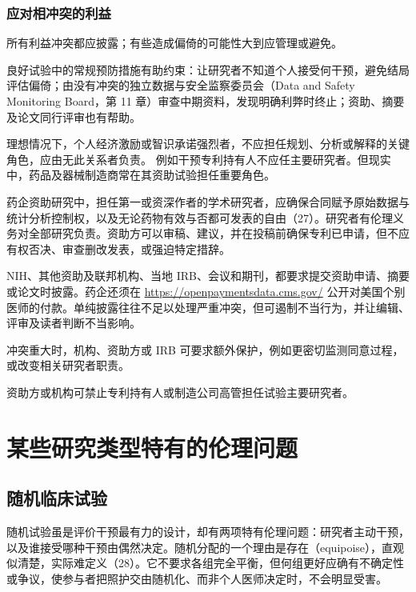 \subsubsection{应对相冲突的利益}
所有利益冲突都应披露；有些造成偏倚的可能性大到应管理或避免。
\begin{description}[leftmargin=2em,labelindent=0pt,style=nextline]
\item[减少偏倚。]良好试验中的常规预防措施有助约束：让研究者不知道个人接受何干预，避免结局评估偏倚；由没有冲突的独立数据与安全监察委员会（Data and Safety Monitoring Board，第 11 章）审查中期资料，发现明确利弊时终止；资助、摘要及论文同行评审也有帮助。
\item[分离冲突角色。]理想情况下，个人经济激励或智识承诺强烈者，不应担任规划、分析或解释的关键角色，应由无此关系者负责。
例如干预专利持有人不应任主要研究者。但现实中，药品及器械制造商常在其资助试验担任重要角色。
\item[掌握分析与发表。]药企资助研究中，担任第一或资深作者的学术研究者，应确保合同赋予原始数据与统计分析控制权，以及无论药物有效与否都可发表的自由（27）。研究者有伦理义务对全部研究负责。资助方可以审稿、建议，并在投稿前确保专利已申请，但不应有权否决、审查删改发表，或强迫特定措辞。
\item[披露。]NIH、其他资助及联邦机构、当地 IRB、会议和期刊，都要求提交资助申请、摘要或论文时披露。药企还须在 \url{https://openpaymentsdata.cms.gov/} 公开对美国个别医师的付款。单纯披露往往不足以处理严重冲突，但可遏制不当行为，并让编辑、评审及读者判断不当影响。
\item[管理。]冲突重大时，机构、资助方或 IRB 可要求额外保护，例如更密切监测同意过程，或改变相关研究者职责。
\item[禁止特定情形。]资助方或机构可禁止专利持有人或制造公司高管担任试验主要研究者。
\end{description}

\section{某些研究类型特有的伦理问题}
\subsection{随机临床试验}
随机试验虽是评价干预最有力的设计，却有两项特有伦理问题：研究者主动干预，以及谁接受哪种干预由偶然决定。随机分配的一个理由是存在（equipoise），直观似清楚，实际难定义（28）。它不要求各组完全平衡，但何组更好应确有不确定性或争议，使参与者把照护交由随机化、而非个人医师决定时，不会明显受害。

